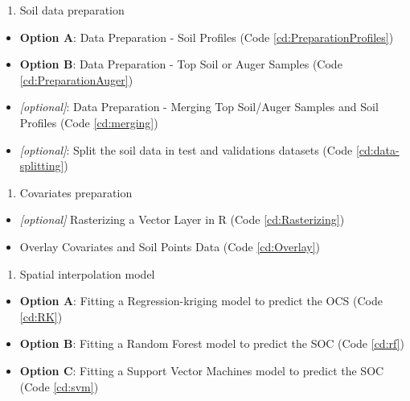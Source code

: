 \documentclass[10pt,b5paper,]{book}
\providecommand{\tightlist}{%
  \setlength{\itemsep}{0pt}\setlength{\parskip}{0pt}}
\theoremstyle{definition}
\theoremstyle{definition}
\theoremstyle{definition}
\theoremstyle{remark}
\begin{document}
\begin{enumerate}
\def\labelenumi{\arabic{enumi}.}
\tightlist
\item
  Soil data preparation
\end{enumerate}

\begin{itemize}
\tightlist
\item
  \textbf{Option A}: Data Preparation - Soil Profiles (Code
  \ref{cd:PreparationProfiles})
\item
  \textbf{Option B}: Data Preparation - Top Soil or Auger Samples (Code
  \ref{cd:PreparationAuger})
\item
  \emph{{[}optional{]}}: Data Preparation - Merging Top Soil/Auger
  Samples and Soil Profiles (Code \ref{cd:merging})
\item
  \emph{{[}optional{]}}: Split the soil data in test and validations
  datasets (Code \ref{cd:data-splitting})
\end{itemize}

\begin{enumerate}
\def\labelenumi{\arabic{enumi}.}
\setcounter{enumi}{1}
\tightlist
\item
  Covariates preparation
\end{enumerate}

\begin{itemize}
\tightlist
\item
  \emph{{[}optional{]}} Rasterizing a Vector Layer in R (Code
  \ref{cd:Rasterizing})
\item
  Overlay Covariates and Soil Points Data (Code \ref{cd:Overlay})
\end{itemize}

\begin{enumerate}
\def\labelenumi{\arabic{enumi}.}
\setcounter{enumi}{2}
\tightlist
\item
  Spatial interpolation model
\end{enumerate}

\begin{itemize}
\tightlist
\item
  \textbf{Option A}: Fitting a Regression-kriging model to predict the
  OCS (Code \ref{cd:RK})
\item
  \textbf{Option B}: Fitting a Random Forest model to predict the SOC
  (Code \ref{cd:rf})
\item
  \textbf{Option C}: Fitting a Support Vector Machines model to predict
  the SOC (Code \ref{cd:svm})
\end{itemize}
\end{document}
